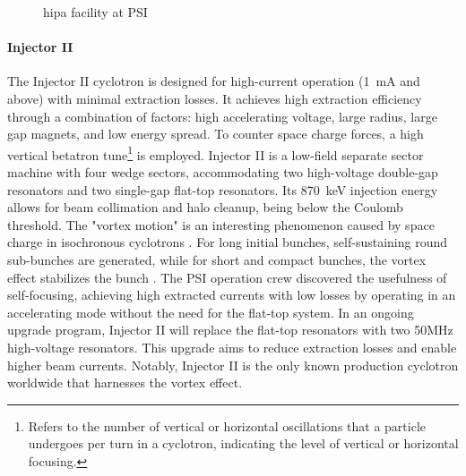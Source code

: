 \begin{refsection}
\begin{figure}
            \caption[HIPA: layout]{\acrfull{hipa} facility at PSI}
            \label{fig:PSI:HIPA}
        \end{figure}
        
        \paragraph{Injector II}  
        The Injector II cyclotron is designed for high-current operation (\SI{1}{mA} and above) with minimal extraction losses. 
        It achieves high extraction efficiency through a combination of factors: high accelerating voltage, large radius, large gap magnets, and low energy spread. 
        To counter space charge forces, a high vertical betatron tune\footnote{Refers to the number of vertical or horizontal oscillations that a particle undergoes per turn in a cyclotron, indicating the level of vertical or horizontal focusing.} is employed. 
        Injector II is a low-field separate sector machine with four wedge sectors, accommodating two high-voltage double-gap resonators and two single-gap flat-top resonators. 
        Its \SI{870}{keV} injection energy allows for beam collimation and halo cleanup, being below the Coulomb threshold.
        The "vortex motion" is an interesting phenomenon caused by space charge in isochronous cyclotrons \cite{vortexeffect}. 
        For long initial bunches, self-sustaining round sub-bunches are generated, while for short and compact bunches, the vortex effect stabilizes the bunch \cite{vortexeffect:longitudinal} \cite{vortexeffect:transverse}. 
        The PSI operation crew discovered the usefulness of self-focusing, achieving high extracted currents with low losses by operating in an accelerating mode without the need for the flat-top system. 
        In an ongoing upgrade program, Injector II will replace the flat-top resonators with two 50MHz high-voltage resonators. 
        This upgrade aims to reduce extraction losses and enable higher beam currents. 
        Notably, Injector II is the only known production cyclotron worldwide that harnesses the vortex effect.


\end{refsection}
